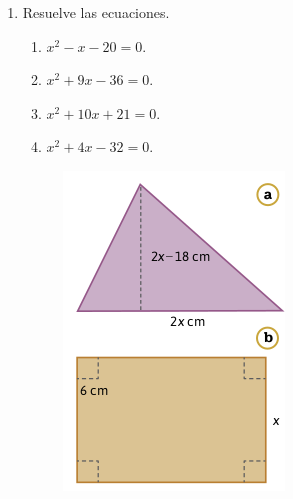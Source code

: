 \documentclass[11pt]{book}
\begin{document}
\begin{enumerate}
    \item Resuelve las ecuaciones.
          \begin{enumerate}
              \item $x^2 -  x  - 20 = 0$.
              \item $x^2 + 9x  - 36 = 0$.
              \item $x^2 + 10x + 21 = 0$.
              \item $x^2 + 4x  - 32 = 0$.
          \end{enumerate}

          \begin{minipage}[t]{0.35\textwidth}
              \begin{figure}[H]
                  \centering
                  \includegraphics[width=\linewidth]{figuras2.7.png}

\end{figure}
\end{minipage}
\end{enumerate}
\end{document}
